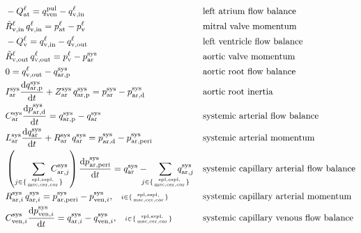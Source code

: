 \documentclass[a4paper,12pt]{report}
\begin{document}
\begin{align}
&-Q_{\mathrm{at}}^{\ell} = q_{\mathrm{ven}}^{\mathrm{pul}} - q_{\mathrm{v,in}}^{\ell} && \text{left atrium flow balance}\nonumber\\
&\tilde{R}_{\mathrm{v,in}}^{\ell}\,q_{\mathrm{v,in}}^{\ell} = p_{\mathrm{at}}^{\ell}-p_{\mathrm{v}}^{\ell} && \text{mitral valve momentum}\nonumber\\
&-Q_{\mathrm{v}}^{\ell} = q_{\mathrm{v,in}}^{\ell} - q_{\mathrm{v,out}}^{\ell} && \text{left ventricle flow balance}\nonumber\\
&\tilde{R}_{\mathrm{v,out}}^{\ell}\,q_{\mathrm{v,out}}^{\ell} = p_{\mathrm{v}}^{\ell}-p_{\mathrm{ar}}^{\mathrm{sys}} && \text{aortic valve momentum}\nonumber\\
&0 = q_{\mathrm{v,out}}^{\ell} - q_{\mathrm{ar,p}}^{\mathrm{sys}} && \text{aortic root flow balance}\nonumber\\
&I_{\mathrm{ar}}^{\mathrm{sys}} \frac{\mathrm{d}q_{\mathrm{ar,p}}^{\mathrm{sys}}}{\mathrm{d}t} + Z_{\mathrm{ar}}^{\mathrm{sys}}\,q_{\mathrm{ar,p}}^{\mathrm{sys}}=p_{\mathrm{ar}}^{\mathrm{sys}}-p_{\mathrm{ar,d}}^{\mathrm{sys}} && \text{aortic root inertia}\nonumber\\
&C_{\mathrm{ar}}^{\mathrm{sys}} \frac{\mathrm{d}p_{\mathrm{ar,d}}^{\mathrm{sys}}}{\mathrm{d}t} = q_{\mathrm{ar,p}}^{\mathrm{sys}} - q_{\mathrm{ar}}^{\mathrm{sys}} && \text{systemic arterial flow balance}\nonumber\\
&L_{\mathrm{ar}}^{\mathrm{sys}}\frac{\mathrm{d}q_{\mathrm{ar}}^{\mathrm{sys}}}{\mathrm{d}t} + R_{\mathrm{ar}}^{\mathrm{sys}}\,q_{\mathrm{ar}}^{\mathrm{sys}}=p_{\mathrm{ar,d}}^{\mathrm{sys}} -p_{\mathrm{ar,peri}}^{\mathrm{sys}} && \text{systemic arterial momentum}\nonumber\\
&\left(\sum_{j\in\{\mathrm{spl,espl,\atop msc,cer,cor}\}}\!\!\!\!\!\!\!\!\!C_{\mathrm{ar},j}^{\mathrm{sys}}\right) \frac{\mathrm{d}p_{\mathrm{ar,peri}}^{\mathrm{sys}}}{\mathrm{d}t} = q_{\mathrm{ar}}^{\mathrm{sys}}-\!\!\!\!\!\sum_{j\in\{\mathrm{spl,espl,\atop msc,cer,cor}\}}\!\!\!\!\!\!\!\!\!q_{\mathrm{ar},j}^{\mathrm{sys}} && \text{systemic capillary arterial flow balance}\nonumber\\
&R_{\mathrm{ar},i}^{\mathrm{sys}}\,q_{\mathrm{ar},i}^{\mathrm{sys}} = p_{\mathrm{ar,peri}}^{\mathrm{sys}} - p_{\mathrm{ven},i}^{\mathrm{sys}}, \quad\scriptstyle{i\in\{\mathrm{spl,espl,\atop msc,cer,cor}\}} && \text{systemic capillary arterial momentum}\nonumber\\
&C_{\mathrm{ven},i}^{\mathrm{sys}} \frac{\mathrm{d}p_{\mathrm{ven},i}^{\mathrm{sys}}}{\mathrm{d}t} = q_{\mathrm{ar},i}^{\mathrm{sys}} - q_{\mathrm{ven},i}^{\mathrm{sys}}, \quad\scriptstyle{i\in\{\mathrm{spl,espl,\atop msc,cer,cor}\}}&& \text{systemic capillary venous flow balance}\nonumber\\

\end{align}
\end{document}
